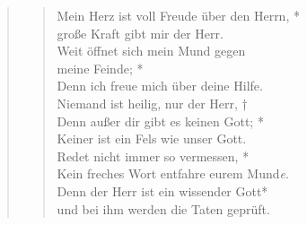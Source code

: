 
\def\greinitialformat#1{{\fontsize{40}{40}\selectfont #1}}
\gresetfirstlineaboveinitial{\small \textcolor{red}{1 Sam 2}}{}
\setaboveinitialseparation{0.72mm}


\begin{quote}
\begin{verse}

 Mein Herz ist voll Freude über den Herrn, *\\
große Kraft gibt mir der Herr.\\
\vin Weit öffnet sich mein Mund gegen \\ \vin meine Feinde; *\\
\vin Denn ich freue mich über deine Hilfe.\\
Niemand ist heilig, nur der Herr, †\\
Denn außer dir gibt es keinen Gott; *\\
Keiner ist ein Fels wie unser Gott.\\
\vin Redet nicht immer so vermessen, *\\
\vin Kein freches Wort entfahre eurem Mund\textit{e}.\\
Denn der Herr ist ein wissender Gott*\\
und bei ihm werden die Taten geprüft.\\


\end{verse}
\end{quote}
